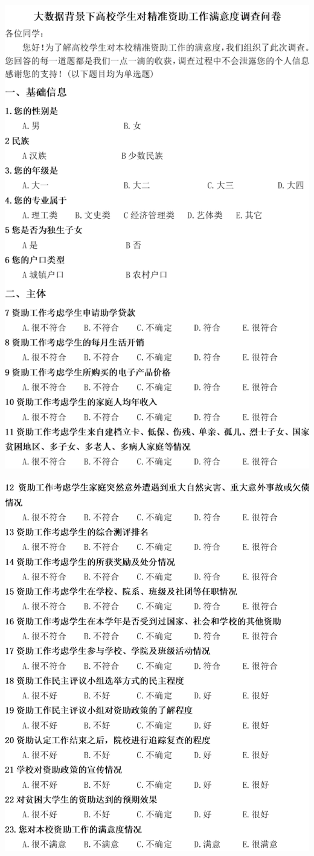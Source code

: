 \documentclass[UTF8,a4paper,12pt]{ctexart}  %
\begin{document}
\includegraphics{idques1.png}

\includegraphics{idques2.png}





\end{document}
